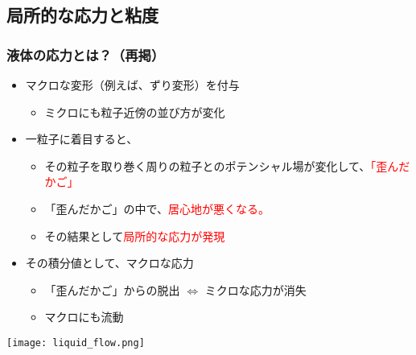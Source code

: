 \documentclass[12pt, dvipdfmx]{beamer}
\begin{document}
\subsection{局所的な応力と粘度}
\begin{frame}
	\frametitle{液体の応力とは？（再掲）}
		\begin{itemize}
			\item マクロな変形（例えば、ずり変形）を付与
			\begin{itemize}
				\item ミクロにも粒子近傍の並び方が変化
			\end{itemize}
			\item 一粒子に着目すると、
			\begin{itemize}
				\item その粒子を取り巻く周りの粒子とのポテンシャル場が変化して、\textcolor{red}{「歪んだかご」}
				\item 「歪んだかご」の中で、\textcolor{red}{居心地が悪くなる。}
				\item その結果として\textcolor{red}{局所的な応力が発現}
			\end{itemize}
			\item その積分値として、マクロな応力
			\begin{itemize}
				\item 「歪んだかご」からの\alert{脱出 $\Leftrightarrow$ ミクロな応力が消失 }
				\item マクロにも\alert{流動}
			\end{itemize}
		\end{itemize}
		\vspace{3mm}
		\begin{center}
			\texttt{[image: liquid\_flow.png]}
		\end{center}
\end{frame}
\end{document}
